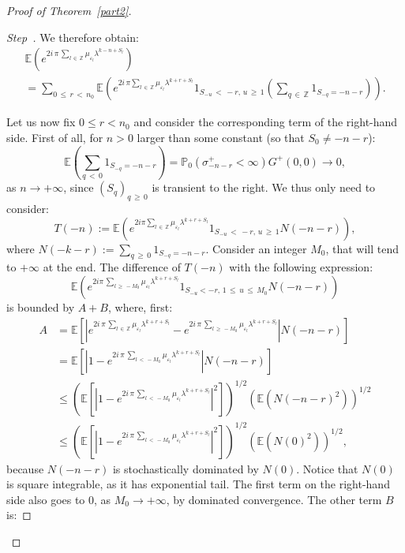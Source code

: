 \documentclass[AHL,Unicode,longabstracts,published]{cedram}
\newcommand{\Pbb}{\mathbb P}
\newcommand{\Ebb}{\mathbb E}
\newcommand{\Zbb}{\mathbb Z}
\newcounter{stepcount}
\newenvironment{step}{\refstepcounter{stepcount}\begin{proof}[Step~\thestepcount]}{\let\qed\relax\end{proof}}
\begin{document}
\begin{proof}[{Proof of Theorem~\ref{part2}}]
\begin{step}
We therefore obtain:
\begin{multline*}
\Ebb\left({e^{2i\,\pi\,\sum_{l\,\in\,\Zbb}\mu_{\varepsilon_l}\lambda^{k-n+S_l}}}\right)\\
=\sum_{0\,\leq\,r\,<\,n_0}\Ebb\left({e^{2i\,\pi \sum_{l\,\in\,\Zbb}\mu_{\varepsilon_{l}}\lambda^{k+r+S_{l}}}1_{S_{-u}\,<\,-r,\,u\,\geq\,1}\left({\sum_{q\,\in\,\Zbb}1_{S_{-q}=-n-r}}\right)}\right).
\end{multline*}



Let us now fix $0\leq r< n_0$ and consider the corresponding term of the right-hand side. First of all, for $n>0$ larger than some constant (so that $S_0\not=-n-r$):
\begin{equation}
\Ebb\left({\sum_{q\,<\,0}1_{S_{-q}=-n-r}}\right)=\Pbb_0\left(\sigma^+_{-n-r}<\infty\right)G^+(0,0)\rightarrow0,
\end{equation}
as $n\rightarrow+\infty$, since $(S_{q})_{q\,\geq\,0}$ is transient to the right. We thus only need to consider:
\[
T(-n):=\Ebb\left({e^{2i\pi \sum_{l\,\in\,\Zbb}\mu_{\varepsilon_{l}}\lambda^{k+r+S_{l}}}1_{S_{-u}\,<\,-r,\,u\,\geq\,1}N(-n-r)}\right),
\]
where $N(-k-r):=\sum_{q\,\geq\,0}1_{S_{-q}=-n-r}$. Consider an integer $M_0$, that will tend to $+\infty$ at the end. The difference of $T(-n)$ with the following expression:
\[
\Ebb\left({e^{2i\pi\,\sum_{l\,\geq\,-M_0}\mu_{\varepsilon_{l}}\lambda^{k+r+S_{l}}}1_{S_{-u}<-r,\,1\,\leq\,u\,\leq\,M_0}N(-n-r)}\right)
\]
is bounded by $A+B$, where, first:
\begin{align*}
A&=\Ebb
\left[
{\left|{e^{2i\,\pi\,\sum_{l\,\in\,\Zbb}\mu_{\varepsilon_l}\lambda^{k+r+S_l}}-e^{2i\,\pi \,\sum_{l\,\geq\,-M_0}\mu_{\varepsilon_l}\lambda^{k+r+S_l}}}\right|N(-n-r)}
\right]
\\
&=\Ebb
\left[
{\left|{1-e^{2i\,\pi\,\sum_{l\,<\,-M_0}\mu_{\varepsilon_l}\lambda^{k+r+S_l}}}\right|N(-n-r)}
\right]
\\
&\leq \left({\Ebb
\left[
{\left|{1-e^{2i\,\pi\,\sum_{l\,<\,-M_0}\mu_{\varepsilon_l}\lambda^{k+r+S_l}}}\right|^2}
\right]
}\right)^{1/2}\left({\Ebb\left(N(-n-r)^2\right)}\right)^{1/2}\\
&\leq \left({\Ebb
\left[
{\left|{1-e^{2i\,\pi\,\sum_{l\,<\,-M_0}\mu_{\varepsilon_l}\lambda^{k+r+S_l}}}\right|^2}
\right]
}\right)^{1/2}\left({\Ebb\left(N(0)^2\right)}\right)^{1/2},
\end{align*}
because $N(-n-r)$ is stochastically dominated by $N(0)$. Notice that $N(0)$ is square integrable, as it has exponential tail. The first term on the right-hand side also goes to 0, as $M_0\rightarrow+\infty$, by dominated convergence. The other term $B$ is:

\end{step}
\end{proof}
\end{document}
